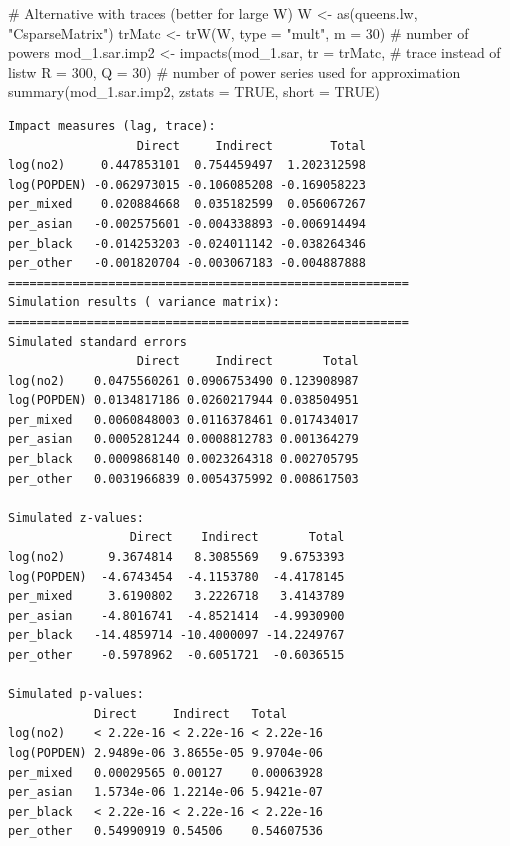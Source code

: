 \documentclass[
  letterpaper,
  DIV=11,
  numbers=noendperiod]{scrreprt}
\newenvironment{Shaded}{\begin{snugshade}}{\end{snugshade}}
\newcommand{\AttributeTok}[1]{\textcolor[rgb]{0.40,0.45,0.13}{#1}}
\newcommand{\CommentTok}[1]{\textcolor[rgb]{0.37,0.37,0.37}{#1}}
\newcommand{\ConstantTok}[1]{\textcolor[rgb]{0.56,0.35,0.01}{#1}}
\newcommand{\DecValTok}[1]{\textcolor[rgb]{0.68,0.00,0.00}{#1}}
\newcommand{\FunctionTok}[1]{\textcolor[rgb]{0.28,0.35,0.67}{#1}}
\newcommand{\NormalTok}[1]{\textcolor[rgb]{0.00,0.23,0.31}{#1}}
\newcommand{\OtherTok}[1]{\textcolor[rgb]{0.00,0.23,0.31}{#1}}
\newcommand{\StringTok}[1]{\textcolor[rgb]{0.13,0.47,0.30}{#1}}
\begin{document}
\begin{Shaded}
\begin{Highlighting}[]
\CommentTok{\# Alternative with traces (better for large W)}
\NormalTok{W }\OtherTok{\textless{}{-}} \FunctionTok{as}\NormalTok{(queens.lw, }\StringTok{"CsparseMatrix"}\NormalTok{)}
\NormalTok{trMatc }\OtherTok{\textless{}{-}} \FunctionTok{trW}\NormalTok{(W, }\AttributeTok{type =} \StringTok{"mult"}\NormalTok{,}
              \AttributeTok{m =} \DecValTok{30}\NormalTok{) }\CommentTok{\# number of powers}
\NormalTok{mod\_1.sar.imp2 }\OtherTok{\textless{}{-}} \FunctionTok{impacts}\NormalTok{(mod\_1.sar, }
                          \AttributeTok{tr =}\NormalTok{ trMatc, }\CommentTok{\# trace instead of listw}
                          \AttributeTok{R =} \DecValTok{300}\NormalTok{, }
                          \AttributeTok{Q =} \DecValTok{30}\NormalTok{) }\CommentTok{\# number of power series used for approximation}
\FunctionTok{summary}\NormalTok{(mod\_1.sar.imp2, }\AttributeTok{zstats =} \ConstantTok{TRUE}\NormalTok{, }\AttributeTok{short =} \ConstantTok{TRUE}\NormalTok{)}
\end{Highlighting}
\end{Shaded}

\begin{verbatim}
Impact measures (lag, trace):
                  Direct     Indirect        Total
log(no2)     0.447853101  0.754459497  1.202312598
log(POPDEN) -0.062973015 -0.106085208 -0.169058223
per_mixed    0.020884668  0.035182599  0.056067267
per_asian   -0.002575601 -0.004338893 -0.006914494
per_black   -0.014253203 -0.024011142 -0.038264346
per_other   -0.001820704 -0.003067183 -0.004887888
========================================================
Simulation results ( variance matrix):
========================================================
Simulated standard errors
                  Direct     Indirect       Total
log(no2)    0.0475560261 0.0906753490 0.123908987
log(POPDEN) 0.0134817186 0.0260217944 0.038504951
per_mixed   0.0060848003 0.0116378461 0.017434017
per_asian   0.0005281244 0.0008812783 0.001364279
per_black   0.0009868140 0.0023264318 0.002705795
per_other   0.0031966839 0.0054375992 0.008617503

Simulated z-values:
                 Direct    Indirect       Total
log(no2)      9.3674814   8.3085569   9.6753393
log(POPDEN)  -4.6743454  -4.1153780  -4.4178145
per_mixed     3.6190802   3.2226718   3.4143789
per_asian    -4.8016741  -4.8521414  -4.9930900
per_black   -14.4859714 -10.4000097 -14.2249767
per_other    -0.5978962  -0.6051721  -0.6036515

Simulated p-values:
            Direct     Indirect   Total     
log(no2)    < 2.22e-16 < 2.22e-16 < 2.22e-16
log(POPDEN) 2.9489e-06 3.8655e-05 9.9704e-06
per_mixed   0.00029565 0.00127    0.00063928
per_asian   1.5734e-06 1.2214e-06 5.9421e-07
per_black   < 2.22e-16 < 2.22e-16 < 2.22e-16
per_other   0.54990919 0.54506    0.54607536
\end{verbatim}
\end{document}
